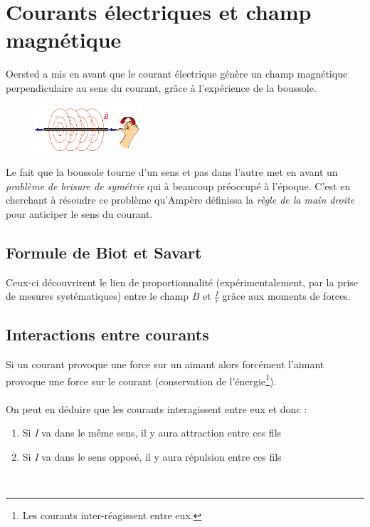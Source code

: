 \documentclass	[11pt, a4paper, openany]{book}
\begin{document}
\section{Courants électriques et champ magnétique}
Oersted a mis en avant que le courant électrique génère un champ magnétique perpendiculaire au sens du courant, grâce à l'expérience de la boussole.\\

\begin{figure}
	\includegraphics[width=4cm]{magneto/image0.png}
\end{figure}

Le fait que la boussole tourne d'un sens et pas dans l'autre met en avant un \textit{problème de brisure de symétrie} qui à beaucoup préoccupé à l'époque. C'est en cherchant à résoudre ce problème qu'Ampère définissa la \textit{règle de la main droite} pour anticiper le sens du courant.

\subsection{Formule de Biot et Savart}
Ceux-ci découvrirent le lien de proportionnalité (expérimentalement, par la prise de mesures systématiques) entre le champ $B$ et $\frac{I}{r}$ grâce aux moments de forces.

\subsection{Interactions entre courants}
Si un courant provoque une force sur un aimant alors forcément l'aimant provoque une force sur le courant (conservation de l'énergie\footnote{Les courants inter-réagissent entre eux.}).\\\\
On peut en déduire que les courants interagissent entre eux et donc :
\begin{enumerate}
	\item Si \textit{I} va dans le même sens, il y aura attraction entre ces fils
	\item Si \textit{I} va dans le sens opposé, il y aura répulsion entre ces fils
\end{enumerate}
\ 
\end{document}
